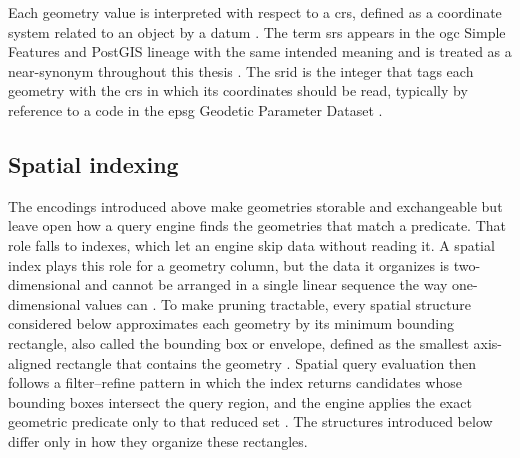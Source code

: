 Each geometry value is interpreted with respect to a \acrshort{crs}, defined as a coordinate system related to an object by a datum \parencite{herring2011_simple_feature_access_part1, lott2021_ogc_topic2_referencing_by_coordinates}. The term \acrfull{srs} appears in the \acrshort{ogc} Simple Features and PostGIS lineage with the same intended meaning and is treated as a near-synonym throughout this thesis \parencite{herring2011_simple_feature_access_part1, postgis2024_manual_34}. The \acrshort{srid} is the integer that tags each geometry with the \acrshort{crs} in which its coordinates should be read, typically by reference to a code in the \acrshort{epsg} Geodetic Parameter Dataset \parencite{herring2011_simple_feature_access_part1, postgis2024_manual_34, iogp2024_epsg_dataset}.

\subsection{Spatial indexing}
\label{sec:spatial-indexing}
The encodings introduced above make geometries storable and exchangeable but leave open how a query engine finds the geometries that match a predicate. That role falls to indexes, which let an engine skip data without reading it. A spatial index plays this role for a geometry column, but the data it organizes is two-dimensional and cannot be arranged in a single linear sequence the way one-dimensional values can \parencite{guttman1984_rtree_dynamic_index}. To make pruning tractable, every spatial structure considered below approximates each geometry by its minimum bounding rectangle, also called the bounding box or envelope, defined as the smallest axis-aligned rectangle that contains the geometry \parencite{herring2011_simple_feature_access_part1}. Spatial query evaluation then follows a filter--refine pattern in which the index returns candidates whose bounding boxes intersect the query region, and the engine applies the exact geometric predicate only to that reduced set \parencite{orenstein1986_spatial_query_processing}. The structures introduced below differ only in how they organize these rectangles.

